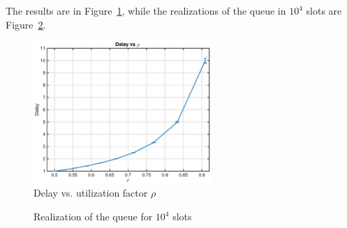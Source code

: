 \documentclass[10pt]{article}
\begin{document}
The results are in Figure~\ref{fig:queue_b}, while the realizations of the queue in $10^4$ slots are Figure~\ref{fig:queue_b_real}.

\begin{figure}[h!]
\centering

  \includegraphics[width = 0.6\textwidth]{queue_b_dl}
  \caption{Delay vs. utilization factor $\rho$}
  \label{fig:queue_b}
\end{figure}

\begin{figure}[h!]
\centering
  \caption{Realization of the queue for $10^4$ slots}
  \label{fig:queue_b_real}
\end{figure}
\end{document}

